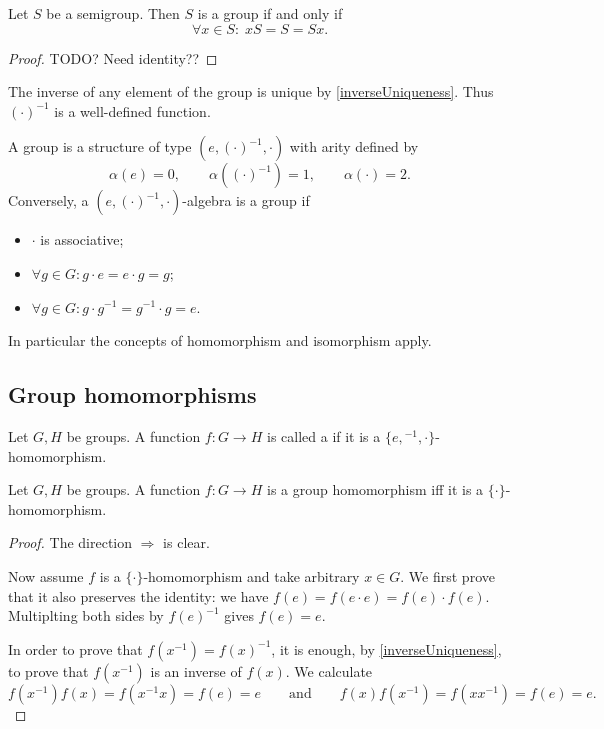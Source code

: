 \begin{lemma}
Let $S$ be a semigroup. Then $S$ is a group \textup{if and only if}
\[ \forall x\in S: \; xS = S = Sx. \]
\end{lemma}
\begin{proof}
TODO? Need identity??
\end{proof}

The inverse of any element of the group is unique by \ref{inverseUniqueness}. Thus $(\cdot)^{-1}$ is a well-defined function.

\begin{proposition}
A group is a structure of type $(e, (\cdot)^{-1}, \boldsymbol{\cdot})$ with arity defined by
\[ \alpha(e) = 0, \qquad \alpha((\cdot)^{-1}) = 1, \qquad \alpha(\boldsymbol{\cdot}) = 2. \]
Conversely, a $(e, (\cdot)^{-1}, \boldsymbol{\cdot})$-algebra is a group if
\begin{itemize}
\item $\boldsymbol{\cdot}$ is associative;
\item $\forall g\in G: g\cdot e = e\cdot g = g$;
\item $\forall g\in G: g\cdot g^{-1} = g^{-1}\cdot g = e$.
\end{itemize}
\end{proposition}
In particular the concepts of homomorphism and isomorphism apply.

\subsection{Group homomorphisms}
\begin{definition}
Let $G,H$ be groups. A function $f: G\to H$ is called a  if it is a $\{e, {}^{-1}, \cdot\}$-homomorphism.
\end{definition}

\begin{lemma} \label{groupHomomorphismPreservesSignature}
Let $G,H$ be groups. A function $f: G\to H$ is a group homomorphism iff it is a $\{\cdot\}$-homomorphism.
\end{lemma}
\begin{proof}
The direction $\Rightarrow$ is clear.

Now assume $f$ is a $\{\cdot\}$-homomorphism and take arbitrary $x\in G$. We first prove that it also preserves the identity: we have $f(e) = f(e\cdot e) = f(e)\cdot f(e)$. Multiplting both sides by $f(e)^{-1}$ gives $f(e) = e$.

In order to prove that $f(x^{-1}) = f(x)^{-1}$, it is enough, by \ref{inverseUniqueness}, to prove that $f(x^{-1})$ is an inverse of $f(x)$. We calculate
\[ f(x^{-1})f(x) = f(x^{-1}x) = f(e) = e \qquad\text{and}\qquad f(x)f(x^{-1}) = f(xx^{-1}) = f(e) = e. \]
\end{proof}


